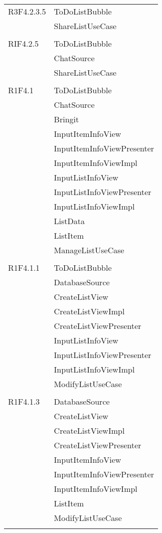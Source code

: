 \begin{center}
\begin{longtable}{|p{7cm}|p{7cm}|}
		R3F4.2.3.5 & ToDoListBubble \\ & ShareListUseCase \\ & \\ \hline
		RIF4.2.5 & ToDoListBubble \\ & ChatSource \\ & ShareListUseCase \\ & \\ \hline
		R1F4.1 & ToDoListBubble \\ & ChatSource \\ & Bringit \\ & InputItemInfoView \\ & InputItemInfoViewPresenter \\ & InputItemInfoViewImpl \\ & InputListInfoView \\ & InputListInfoViewPresenter \\ & InputListInfoViewImpl \\ & ListData \\ & ListItem \\ & ManageListUseCase \\ & \\ \hline
		R1F4.1.1 & ToDoListBubble \\ & DatabaseSource \\ & CreateListView \\ & CreateListViewImpl \\ & CreateListViewPresenter \\ & InputListInfoView \\ & InputListInfoViewPresenter \\ & InputListInfoViewImpl \\ & ModifyListUseCase \\ & \\ \hline
		R1F4.1.3 & DatabaseSource \\ & CreateListView \\ & CreateListViewImpl \\ & CreateListViewPresenter \\ & InputItemInfoView \\ & InputItemInfoViewPresenter \\ & InputItemInfoViewImpl \\ & ListItem \\ & ModifyListUseCase \\ & \\ \hline

\end{longtable}
\end{center}
